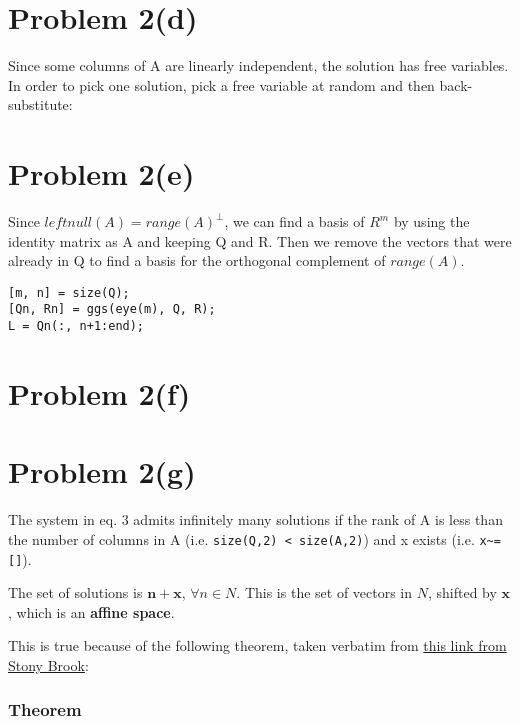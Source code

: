 \documentclass{article}
\begin{document}
\section*{Problem 2(d)}

Since some columns of A are linearly independent, the solution has free variables. In order to pick one solution, pick a free variable at random and then back-substitute:

\section*{Problem 2(e)}

Since $leftnull(A) = range(A)^{\perp}$, we can find a basis of $R^m$ by using the identity matrix as A and keeping Q and R. Then we remove the vectors that were already in Q to find a basis for the orthogonal complement of $range(A)$.

\begin{verbatim}
[m, n] = size(Q);
[Qn, Rn] = ggs(eye(m), Q, R);
L = Qn(:, n+1:end);
\end{verbatim}

\section*{Problem 2(f)}


\section*{Problem 2(g)}

The system in eq. 3 admits infinitely many solutions if the rank of A is less than the number of columns in A (i.e. \verb#size(Q,2) < size(A,2)#) and x exists (i.e. \verb#x~=[]#).

The set of solutions is $ \mathbf{n} + \mathbf{x}$, $ \forall n \in N $. This is the set of vectors in $N$, shifted by $\mathbf{x}$, which is an \textbf{affine space}.

This is true because of the following theorem, taken verbatim from \href{https://www.math.stonybrook.edu/~badger/mat211f12/solver2.pdf}{this link from Stony Brook}:

\subsubsection*{Theorem}
\end{document}
